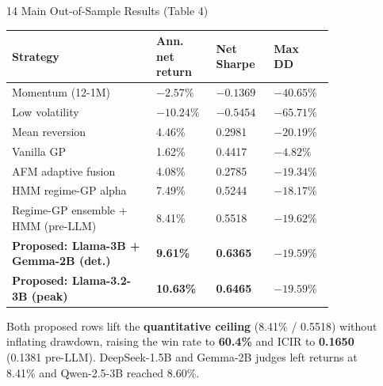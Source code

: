 \documentclass[final]{beamer}
\newcommand{\hl}[1]{\textbf{\color{navy2}#1}}
\newcommand{\gd}[1]{\textbf{\color{good}#1}}
\begin{document}
\begin{frame}[t]{}
\begin{columns}[t]
\begin{column}{0.325\textwidth}
\end{column}
\begin{column}{0.325\textwidth}

\begin{block}{14 \; Main Out-of-Sample Results (Table 4)}
{\footnotesize
\setlength{\tabcolsep}{0.24cm}
\renewcommand{\arraystretch}{1.24}
\begin{tabular}{@{}L{0.40\linewidth}C{0.14\linewidth}C{0.16\linewidth}C{0.14\linewidth}@{}}
\toprule
\textbf{Strategy} & \textbf{Ann. net return} & \textbf{Net Sharpe} & \textbf{Max DD}\\
\midrule
Momentum (12-1M) & $-2.57\%$ & $-0.1369$ & $-40.65\%$\\
Low volatility & $-10.24\%$ & $-0.5454$ & $-65.71\%$\\
Mean reversion & 4.46\% & 0.2981 & $-20.19\%$\\
Vanilla GP & 1.62\% & 0.4417 & $-4.82\%$\\
AFM adaptive fusion & 4.08\% & 0.2785 & $-19.34\%$\\
HMM regime-GP alpha & 7.49\% & 0.5244 & $-18.17\%$\\
Regime-GP ensemble + HMM (pre-LLM) & 8.41\% & 0.5518 & $-19.62\%$\\
\midrule
{}
\textbf{Proposed: Llama-3B + Gemma-2B (det.)} & \gd{9.61\%} & \gd{0.6365} & $-19.59\%$\\
\textbf{Proposed: Llama-3.2-3B (peak)} & \gd{10.63\%} & \gd{0.6465} & $-19.59\%$\\
\bottomrule
\end{tabular}}
\vskip0.15cm
Both proposed rows lift the \hl{quantitative ceiling} (8.41\% / 0.5518) without inflating drawdown, raising the win rate to \gd{60.4\%} and ICIR to \gd{0.1650} (0.1381 pre-LLM). DeepSeek-1.5B and Gemma-2B judges left returns at 8.41\% and Qwen-2.5-3B reached 8.60\%.
\end{block}


\end{column}
\end{columns}
\end{frame}
\end{document}

